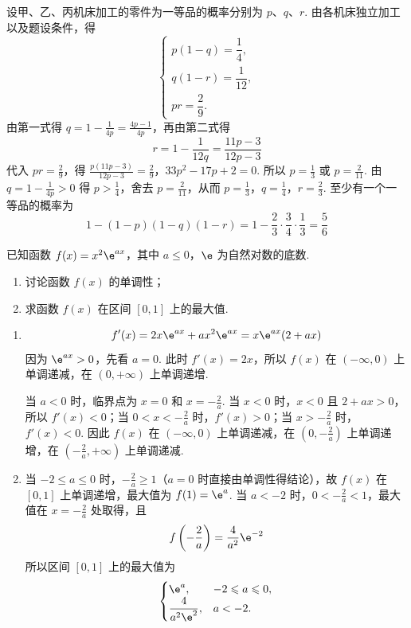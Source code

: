 \begin{solution}
设甲、乙、丙机床加工的零件为一等品的概率分别为 \(p\)、\(q\)、\(r\). 由各机床独立加工以及题设条件，得
\[
\begin{cases}
p(1-q)=\dfrac{1}{4},\\
q(1-r)=\dfrac{1}{12},\\
pr=\dfrac{2}{9}.
\end{cases}
\]
由第一式得 \(q=1-\frac{1}{4p}=\frac{4p-1}{4p}\)，再由第二式得
\[
r=1-\frac{1}{12q}=\frac{11p-3}{12p-3}
\]
代入 \(pr=\frac{2}{9}\)，得
\(\frac{p(11p-3)}{12p-3}=\frac{2}{9}\)，\(33p^2-17p+2=0\).
所以 \(p=\frac{1}{3}\) 或 \(p=\frac{2}{11}\). 由 \(q=1-\frac{1}{4p}>0\) 得 \(p>\frac{1}{4}\)，舍去 \(p=\frac{2}{11}\)，从而 \(p=\frac{1}{3}\)，\(q=\frac{1}{4}\)，\(r=\frac{2}{3}\).
至少有一个一等品的概率为
\[
1-(1-p)(1-q)(1-r)=1-\frac{2}{3}\cdot\frac{3}{4}\cdot\frac{1}{3}=\frac{5}{6}
\]
\end{solution}

\begin{problem}
已知函数 \(f(x)=x^{2}\e^{ax}\)，其中 \(a\leqslant 0\)，\(\e\) 为自然对数的底数.

\begin{enumerate}
\item 讨论函数 \(f(x)\) 的单调性；
\item 求函数 \(f(x)\) 在区间 \([0,1]\) 上的最大值.
\end{enumerate}
\end{problem}

\begin{solution}
\begin{enumerate}
\item
\[
f'(x)=2x\e^{ax}+ax^2\e^{ax}=x\e^{ax}(2+ax)
\]
因为 \(\e^{ax}>0\)，先看 \(a=0\). 此时 \(f'(x)=2x\)，所以 \(f(x)\) 在 \((-\infty,0)\) 上单调递减，在 \((0,+\infty)\) 上单调递增.

当 \(a<0\) 时，临界点为 \(x=0\) 和 \(x=-\frac{2}{a}\). 当 \(x<0\) 时，\(x<0\) 且 \(2+ax>0\)，所以 \(f'(x)<0\)；当 \(0<x<-\frac{2}{a}\) 时，\(f'(x)>0\)；当 \(x>-\frac{2}{a}\) 时，\(f'(x)<0\). 因此 \(f(x)\) 在 \((-\infty,0)\) 上单调递减，在 \(\left(0,-\frac{2}{a}\right)\) 上单调递增，在 \(\left(-\frac{2}{a},+\infty\right)\) 上单调递减.
\item 当 \(-2\leqslant a\leqslant0\) 时，\(-\frac{2}{a}\geqslant1\)（\(a=0\) 时直接由单调性得结论），故 \(f(x)\) 在 \([0,1]\) 上单调递增，最大值为 \(f(1)=\e^a\). 当 \(a<-2\) 时，\(0<-\frac{2}{a}<1\)，最大值在 \(x=-\frac{2}{a}\) 处取得，且
\[
f\left(-\frac{2}{a}\right)=\frac{4}{a^2}\e^{-2}
\]
所以区间 \([0,1]\) 上的最大值为
\[
\begin{cases}
\e^a,&-2\leqslant a\leqslant0,\\
\dfrac{4}{a^2\e^2},&a<-2.
\end{cases}
\]
\end{enumerate}
\end{solution}

